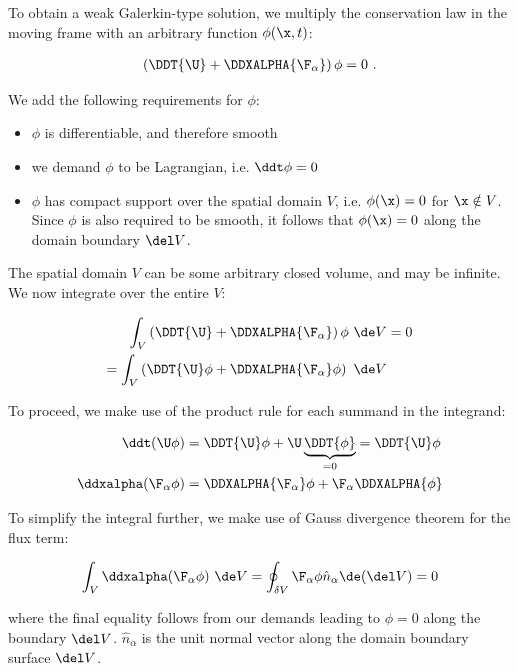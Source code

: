 To obtain a weak Galerkin-type solution, we multiply the conservation law in the moving frame with
an arbitrary function $\phi(\x, t)$:

\begin{align}
    \left(\DDT{\U} + \DDXALPHA{\F_\alpha} \right) \phi = 0 \ .
\end{align}

We add the following requirements for $\phi$:
\begin{itemize}
 \item $\phi$ is differentiable, and therefore smooth
 \item we demand $\phi$ to be Lagrangian, i.e. $\ddt \phi = 0$
 \item $\phi$ has compact support over the spatial domain $V$, i.e. $\phi(\x) = 0$ for $\x \notin
V$. Since $\phi$ is also required to be smooth, it follows that $\phi(\x) = 0$ along the domain
boundary $\del V$.
\end{itemize}

The spatial domain $V$ can be some arbitrary closed volume, and may be infinite. We now integrate
over the entire $V$:

\begin{align}
    \int_V \left(\DDT{\U} + \DDXALPHA{\F_\alpha} \right) \phi \ \de V & = 0 \\
    = \int_V \left(\DDT{\U} \phi + \DDXALPHA{\F_\alpha} \phi \right) \ \de V &
    \label{step:hopkins-integral-start}
\end{align}

To proceed, we make use of the product rule for each summand in the integrand:

\begin{align}
    \ddt ( \U \phi ) &= \DDT{\U}\phi + \U \underbrace{\DDT{\phi}}_{ = 0} = \DDT{\U} \phi \\
    \ddxalpha ( \F_\alpha \phi ) &= \DDXALPHA{\F_\alpha}\phi + \F_\alpha \DDXALPHA{\phi}
\end{align}

To simplify the integral further, we make use of Gauss divergence theorem for the flux term:

\begin{align}
    \int_V \ddxalpha (\F_\alpha \phi) \ \de V =
        \oint_{\delta V} \F_\alpha \phi \hat{n}_\alpha \de (\del V) = 0
\end{align}

where the final equality follows from our demands leading to $\phi = 0$ along the boundary $\del V$.
$\hat{n}_\alpha$ is the unit normal vector along the domain boundary surface $\del V$.

